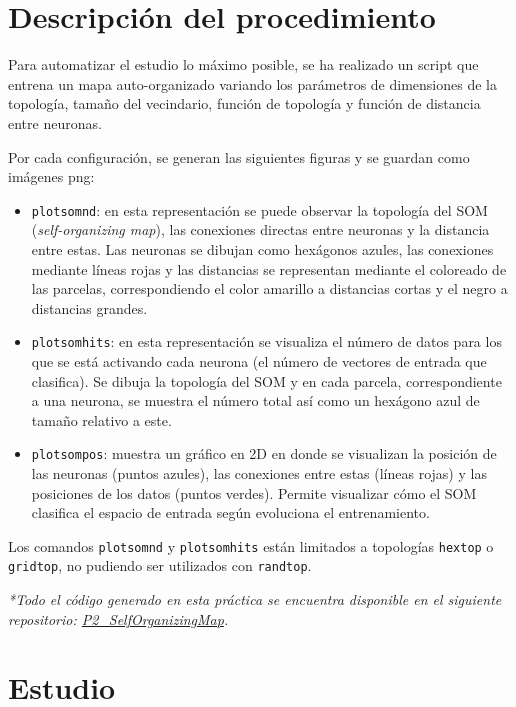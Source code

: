 \documentclass[a4paper,12pt,titlepage]{article}
\begin{document}
\section{Descripción del procedimiento}

Para automatizar el estudio lo máximo posible, se ha realizado un script que entrena un mapa auto-organizado variando los parámetros de dimensiones de la topología, tamaño del vecindario, función de topología y función de distancia entre neuronas. 

Por cada configuración, se generan las siguientes figuras y se guardan como imágenes png:

\begin{itemize}[noitemsep]
	\item \lstinline|plotsomnd|: en esta representación se puede observar la topología del SOM (\textit{self-organizing map}), las conexiones directas entre neuronas y la distancia entre estas. Las neuronas se dibujan como hexágonos azules, las conexiones mediante líneas rojas y las distancias se representan mediante el coloreado de las parcelas, correspondiendo el color amarillo a distancias cortas y el negro a distancias grandes. \citep{matlab:plotsomnd}
	\item \lstinline|plotsomhits|: en esta representación se visualiza el número de datos para los que se está activando cada neurona (el número de vectores de entrada que clasifica). Se dibuja la topología del SOM y en cada parcela, correspondiente a una neurona, se muestra el número total así como un hexágono azul de tamaño relativo a este. \citep{matlab:plotsomhits}
	\item \lstinline|plotsompos|: muestra un gráfico en 2D en donde se visualizan la posición de las neuronas (puntos azules), las conexiones entre estas (líneas rojas) y las posiciones de los datos (puntos verdes). Permite visualizar cómo el SOM clasifica el espacio de entrada según evoluciona el entrenamiento. \citep{matlab:plotsompos}
\end{itemize}

Los comandos \lstinline|plotsomnd| y \lstinline|plotsomhits| están limitados a topologías \lstinline|hextop| o \lstinline|gridtop|, no pudiendo ser utilizados con \lstinline|randtop|. 

\emph{*Todo el código generado en esta práctica se encuentra disponible en el siguiente repositorio: 
\href{https://github.com/davidmigloz/neuronal-networks/tree/master/P2\_SelfOrganizingMap}{P2\_SelfOrganizingMap}.}

\section{Estudio}
\end{document}
